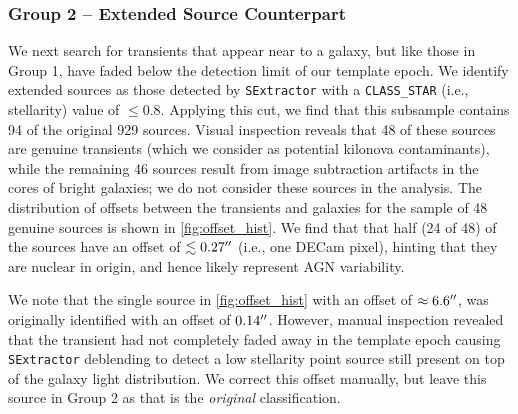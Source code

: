 \subsubsection{Group 2 -- Extended Source Counterpart}
\label{sec:group2}
We next search for transients that appear near to a galaxy, but like those in Group 1, have faded below the detection limit of our template epoch. We identify extended sources as those detected by {\tt SExtractor} with a {\tt CLASS\_STAR} (i.e., stellarity) value of $\le 0.8$. Applying this cut, we find that this subsample contains 94 of the original 929 sources. Visual inspection reveals that 48 of these sources are genuine transients (which we consider as potential kilonova contaminants), while the remaining 46 sources result from image subtraction artifacts in the cores of bright galaxies; we do not consider these sources in the analysis. The distribution of offsets between the transients and galaxies for the sample of 48 genuine sources is shown in \autoref{fig:offset_hist}. We find that that half (24 of 48) of the sources have an offset of $\lesssim 0.27\hbox{$^{\prime\prime}$}$ (i.e., one DECam pixel), hinting that they are nuclear in origin, and hence likely represent AGN variability.

We note that the single source in \autoref{fig:offset_hist} with an offset of $\approx6.6\hbox{$^{\prime\prime}$}$, was originally identified with an offset of $0.14\hbox{$^{\prime\prime}$}$. However, manual inspection revealed that the transient had not completely faded away in the template epoch causing {\tt SExtractor} deblending to detect a low stellarity point source still present on top of the galaxy light distribution. We correct this offset manually, but leave this source in Group 2 as that is the {\it original} classification.

